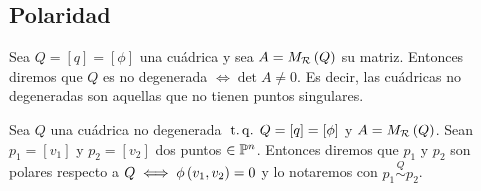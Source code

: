 \subsection{Polaridad}

\begin{defi}
  Sea $Q=[q]=[\phi]$ una cuádrica y sea $A=M_{\mathcal{R}}\left( Q\right)$ su matriz. Entonces diremos que $Q$ es no
  degenerada $\iff \det A \neq 0$. Es decir, las cuádricas no degeneradas son aquellas que no tienen
  puntos singulares.
\end{defi}

\begin{defi}
  Sea $Q$ una cuádrica no degenerada $\operatorname{\;t.q.\;} Q=[q]=[\phi]$ y $A=M_{\mathcal{R}}\left( Q\right)$. Sean $p_1=[v_1]$ y 
  $p_2=[v_2]$ dos puntos $\in \mathbb{P}^n$. Entonces diremos que $p_1$ y $p_2$ son polares respecto a $Q\iff
  \phi\left( v_1,v_2\right)=0$ y lo notaremos con $p_1 \stackrel{Q}{\sim} p_2$. 
\end{defi}

